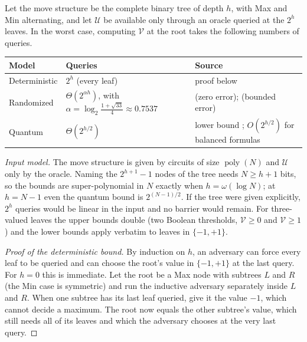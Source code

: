\documentclass[final]{siamart0516}
\numberwithin{theorem}{section}
\numberwithin{equation}{section}
\theoremstyle{siamnonum}
\theoremstyle{plain}
\newcommand{\val}{\mathcal{V}}            %
\newcommand{\pay}{\mathcal{U}}            %
\newcommand{\poly}{\operatorname{poly}}
\begin{document}
\begin{theorem}\label{thm:query}
Let the move structure be the complete binary tree of depth $h$, with Max and Min alternating, and let $\pay$ be available only through an oracle queried at the $2^h$ leaves. In the worst case, computing $\val$ at the root takes the following numbers of queries.
\begin{center}\small
\begin{tabularx}{\linewidth}{@{}l>{\raggedright\arraybackslash}X>{\raggedright\arraybackslash}X@{}}
\toprule
Model & Queries & Source\\ \midrule
Deterministic & $2^h$ (every leaf) & proof below\\
Randomized & $\Theta(2^{\alpha h})$, with $\alpha=\log_2\frac{1+\sqrt{33}}{4}\approx 0.7537$ & \cite{Snir,SaksWigderson} (zero error); \cite{Santha} (bounded error)\\
Quantum & $\Theta(2^{h/2})$ & lower bound \cite{BarnumSaks}; $O(2^{h/2})$ for balanced formulas \cite{ACRSZ,ReichardtSpalek}\\
\bottomrule
\end{tabularx}
\end{center}
\end{theorem}

\noindent\emph{Input model.} The move structure is given by circuits of size $\poly(N)$ and $\pay$ only by the oracle. Naming the $2^{h+1}-1$ nodes of the tree needs $N\ge h+1$ bits, so the bounds are super-polynomial in $N$ exactly when $h=\omega(\log N)$; at $h=N-1$ even the quantum bound is $2^{(N-1)/2}$. If the tree were given explicitly, $2^h$ queries would be linear in the input and no barrier would remain. For three-valued leaves the upper bounds double (two Boolean thresholds, $\val\ge 0$ and $\val\ge1$) and the lower bounds apply verbatim to leaves in $\{-1,+1\}$.

\begin{proof}[Proof of the deterministic bound]
By induction on $h$, an adversary can force every leaf to be queried and can choose the root's value in $\{-1,+1\}$ at the last query. For $h=0$ this is immediate. Let the root be a Max node with subtrees $L$ and $R$ (the Min case is symmetric) and run the inductive adversary separately inside $L$ and $R$. When one subtree has its last leaf queried, give it the value $-1$, which cannot decide a maximum. The root now equals the other subtree's value, which still needs all of its leaves and which the adversary chooses at the very last query.
\end{proof}
\end{document}
